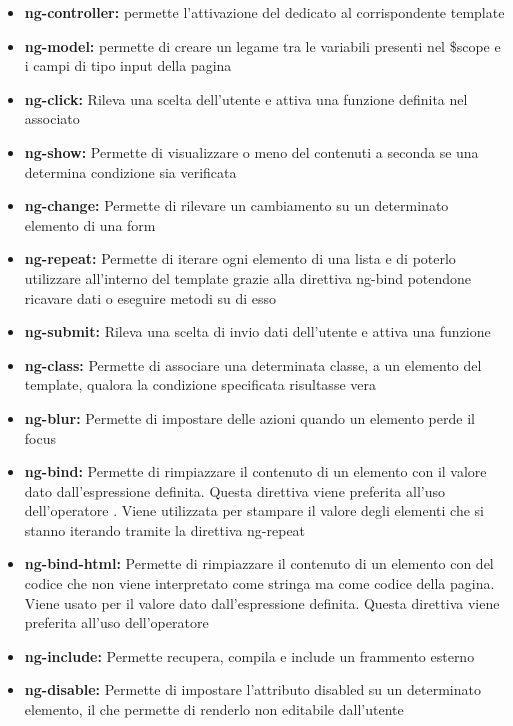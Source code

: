 \begin{itemize}
	\item \textbf{ng-controller:} permette l’attivazione del  dedicato al corrispondente template 
	\item \textbf{ng-model:} permette di creare un legame tra le variabili presenti nel \$scope e i campi di tipo input della pagina 
	\item \textbf{ng-click:} Rileva una scelta dell’utente e attiva una funzione definita nel  associato
	\item \textbf{ng-show:} Permette di visualizzare o meno del contenuti  a seconda se una determina condizione sia verificata
	\item \textbf{ng-change:} Permette di rilevare un cambiamento su un determinato elemento di una form
	\item \textbf{ng-repeat:} Permette di iterare ogni elemento di una lista e di poterlo utilizzare all’interno del template  grazie alla direttiva ng-bind potendone ricavare dati o eseguire metodi su di esso
	\item \textbf{ng-submit:} Rileva una scelta di invio dati dell’utente e attiva una funzione
	\item \textbf{ng-class:} Permette di associare una determinata classe, a un elemento del template, qualora la condizione specificata risultasse vera
	\item \textbf{ng-blur:} Permette di impostare delle azioni quando un elemento  perde il focus
	\item \textbf{ng-bind:} Permette di rimpiazzare il contenuto di un elemento con il valore dato dall’espressione definita. Questa direttiva viene preferita all’uso dell’operatore {{ }}. Viene utilizzata per stampare il valore degli elementi che si stanno iterando tramite la direttiva ng-repeat
	\item \textbf{ng-bind-html:} Permette di rimpiazzare il contenuto di un elemento con del codice  che non viene interpretato come stringa ma come codice della pagina. Viene usato per il valore dato dall’espressione definita. Questa direttiva viene preferita all’uso dell’operatore {{ }}
	\item \textbf{ng-include:} Permette recupera, compila e include un frammento  esterno
	\item \textbf{ng-disable:} Permette di impostare l'attributo disabled su un determinato elemento, il che permette di renderlo non editabile dall'utente

\end{itemize}

